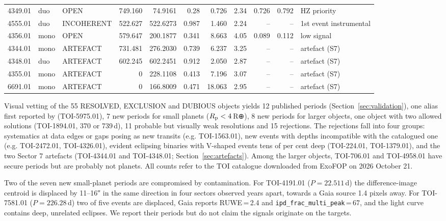 \documentclass[fleqn,usenatbib]{mnras}
\newcommand{\Rp}{\ensuremath{R_{\rm p}}}
\begin{document}
\begin{table}
\begin{tabular}{lllrrrrrrrl}
4349.01 & duo & OPEN & 749.160 & 74.9161 & 0.28 & 0.726 & 2.34 & 0.726 & 0.792 & HZ priority \\
4555.01 & duo & INCOHERENT & 522.627 & 522.6273 & 0.987 & 1.460 & 2.24 & -- & -- & 1st event instrumental \\
4356.01 & mono & OPEN & 579.647 & 200.1877 & 0.341 & 8.663 & 4.05 & 0.089 & 0.112 & low signal \\
4344.01 & mono & ARTEFACT & 731.481 & 276.2030 & 0.739 & 6.237 & 3.25 & -- & -- & artefact (S7) \\
4348.01 & duo & ARTEFACT & 602.245 & 602.2451 & 0.912 & 2.050 & 2.87 & -- & -- & artefact (S7) \\
4355.01 & mono & ARTEFACT & 0 & 228.1108 & 0.413 & 7.196 & 3.07 & -- & -- & artefact (S7) \\
6691.01 & mono & ARTEFACT & 0 & 166.8009 & 0.471 & 18.063 & 2.95 & -- & -- & artefact (S7) \\
\bottomrule
\end{tabular}
\end{table}

Visual vetting of the 55 RESOLVED, EXCLUSION and DUBIOUS objects yields 12 published periods (Section~\ref{sec:validation}), one alias first reported by \citet{Bass2025} (TOI-5975.01), 7 new periods for small planets ($\Rp < 4$\,R⊕), 8 new periods for larger objects, one object with two allowed solutions (TOI-1894.01, 370 or 739\,d), 11 probable but visually weak resolutions and 15 rejections. The rejections fall into four groups: systematics at data edges or gaps posing as new transits (e.g. TOI-1563.01), new events with depths incompatible with the catalogued one (e.g. TOI-2472.01, TOI-4326.01), evident eclipsing binaries with V-shaped events tens of per cent deep (TOI-224.01, TOI-1379.01), and the two Sector 7 artefacts (TOI-4344.01 and TOI-4348.01; Section~\ref{sec:artefacts}). Among the larger objects, TOI-706.01 and TOI-4958.01 have secure periods but are probably not planets. All counts refer to the TOI catalogue downloaded from ExoFOP on 2026 October 21.

Two of the seven new small-planet periods are compromised by contamination. For TOI-4191.01 ($P = 22.511$\,d) the difference-image centroid is displaced by 11--16″ in the same direction in four sectors observed years apart, towards a Gaia source 1.4 pixels away. For TOI-7581.01 ($P = 226.28$\,d) two of five events are displaced, Gaia reports RUWE\,=\,2.4 and \texttt{ipd\_frac\_multi\_peak}\,=\,67, and the light curve contains deep, unrelated eclipses. We report their periods but do not claim the signals originate on the targets.
\end{document}
